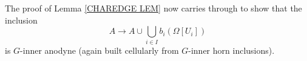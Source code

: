 \documentclass[a4paper,10pt
,draft
]{article}%
\begin{document}
\begin{remark}
The proof of Lemma \ref{CHAREDGE LEM} now carries through to show that the inclusion
\begin{equation}
	A \to A \cup \bigcup_{i \in I} b_i(\Omega[U_i])
\end{equation}
is $G$-inner anodyne (again built cellularly from $G$-inner horn inclusions).
\end{remark}


\end{document}

